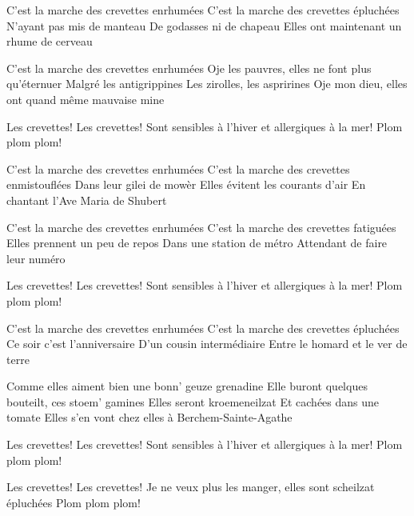\footnotemark [ititle={Marche des Crevettes, La}]

\beginverse
C'est la marche des crevettes enrhumées
C'est la marche des crevettes épluchées
N'ayant pas mis de manteau
De godasses ni de chapeau
Elles ont maintenant un rhume de cerveau
\endverse

\beginverse
C'est la marche des crevettes enrhumées
Oje les pauvres, elles ne font plus qu'éternuer
Malgré les antigrippines
Les zirolles, les asprirines
Oje mon dieu, elles ont quand même mauvaise mine
\endverse

\beginchorus
Les crevettes! Les crevettes!
Sont sensibles à l'hiver et allergiques à la mer!
Plom plom plom!
\endchorus

\beginverse
C'est la marche des crevettes enrhumées
C'est la marche des crevettes enmistouflées
Dans leur gilei de mowèr
Elles évitent les courants d'air
En chantant l'Ave Maria de Shubert
\endverse

\beginverse
C'est la marche des crevettes enrhumées
C'est la marche des crevettes fatiguées
Elles prennent un peu de repos
Dans une station de métro
Attendant de faire leur numéro
\endverse

\beginchorus
Les crevettes! Les crevettes!
Sont sensibles à l'hiver et allergiques à la mer!
Plom plom plom!
\endchorus

\beginverse
C'est la marche des crevettes enrhumées
C'est la marche des crevettes épluchées
Ce soir c'est l'anniversaire
D'un cousin intermédiaire
Entre le homard et le ver de terre
\endverse

\beginverse
Comme elles aiment bien une bonn' geuze grenadine
Elle buront quelques bouteilt, ces stoem' gamines
Elles seront kroemeneilzat
Et cachées dans une tomate
Elles s'en vont chez elles à Berchem-Sainte-Agathe
\endverse

\beginchorus
Les crevettes! Les crevettes!
Sont sensibles à l'hiver et allergiques à la mer!
Plom plom plom!
\endchorus

\beginchorus
Les crevettes! Les crevettes!
Je ne veux plus les manger, elles sont scheilzat épluchées
Plom plom plom!
\endchorus
\endsong